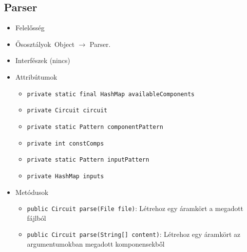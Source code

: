 \subsection{Parser}
\begin{itemize}
\item Felelősség\\

\item Ősosztályok\ Object $\rightarrow{}$ Parser.
\item Interfészek (nincs)
\item Attribútumok $\ $
\begin{itemize}
	\item \texttt{private static final HashMap availableComponents} 
	\item \texttt{private Circuit circuit} 
	\item \texttt{private static Pattern componentPattern} 
	\item \texttt{private int constComps} 
	\item \texttt{private static Pattern inputPattern} 
	\item \texttt{private HashMap inputs} 
\end{itemize}
\item Metódusok$\ $
\begin{itemize}
	\item \texttt{public Circuit parse(File file)}: Létrehoz egy áramkört a megadott fájlból
	\item \texttt{public Circuit parse(String[] content)}: Létrehoz egy áramkört az argumentumokban megadott komponensekből
\end{itemize}
\end{itemize}

